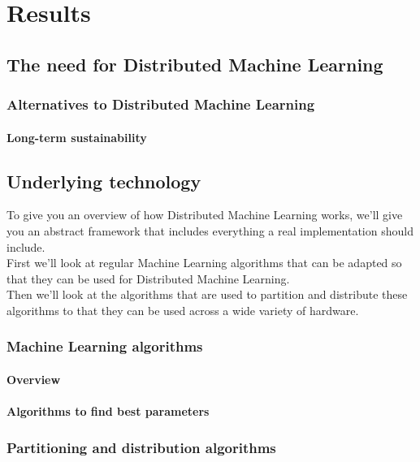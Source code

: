 \section{Results}

\subsection{The need for Distributed Machine Learning}
\subsubsection{Alternatives to Distributed Machine Learning}
\paragraph{Long-term sustainability}










\subsection{Underlying technology}
To give you an overview of how Distributed Machine Learning works, we'll give you an abstract framework that includes everything a real implementation should include.\\
First we'll look at regular Machine Learning algorithms that can be adapted so that they can be used for Distributed Machine Learning.\\
Then we'll look at the algorithms that are used to partition and distribute these algorithms to that they can be used across a wide variety of hardware.
\subsubsection{Machine Learning algorithms}
\paragraph{Overview}
\paragraph{Algorithms to find best parameters}
\subsubsection{Partitioning and distribution algorithms}
